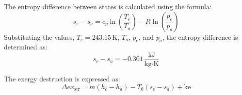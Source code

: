 The entropy difference between states is calculated using the formula:  
\[
s_e - s_a = c_p \ln \left( \frac{T_e}{T_a} \right) - R \ln \left( \frac{p_e}{p_a} \right)
\]  
Substituting the values, \( T_e = 243.15 \, \text{K} \), \( T_a \), \( p_e \), and \( p_a \), the entropy difference is determined as:  
\[
s_e - s_a = -0.301 \, \frac{\text{kJ}}{\text{kg·K}}
\]  

The exergy destruction is expressed as:  
\[
\Delta ex_{\text{str}} = \dot{m} \left( h_e - h_a \right) - T_0 \left( s_e - s_a \right) + \text{ke}
\]